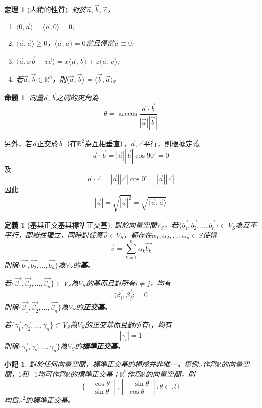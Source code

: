 \documentclass[12pt]{article}
\newcommand{\innerprod}[2]{\langle{#1},{#2}\rangle}
\newtheorem{definition}{定義}
\newtheorem*{theorem}{定理}
\newtheorem*{proposition}{命題}
\newtheorem*{remark}{小記}
\begin{document}
    \begin{theorem}[内積的性質]
        對於$\vec{a},\vec{b},\vec{c}$，\begin{enumerate}
            \item $\innerprod{0}{\vec{a}}=\innerprod{\vec{a}}{0}=0$;
            \item $\innerprod{\vec{a}}{\vec{a}}\geq 0$，$\innerprod{\vec{a}}{\vec{a}}=0$當且僅當$\vec{a}\equiv 0$;
            \item $\innerprod{\vec{a}}{x\vec{b}+z\vec{c}}=x\innerprod{\vec{a}}{\vec{b}}+z\innerprod{\vec{a}}{\vec{c}}$;
            \item 若$\vec{a},\vec{b}\in\mathbb{R}^n$，則$\innerprod{\vec{a}}{\vec{b}}=\innerprod{\vec{b}}{\vec{a}}$。
        \end{enumerate}
    \end{theorem}

    \begin{proposition}
        向量$\vec{a},\vec{b}$之間的夾角為$$\theta=\arccos{\frac{\vec{a}\cdot\vec{b}}{|\vec{a}||\vec{b}|}}$$
    \end{proposition}

    另外，若$\vec{a}$正交於$\vec{b}$（在$\mathbb{R}^2$為互相垂直），$\vec{a},\vec{c}$平行，則根據定義$$\vec{a}\cdot\vec{b}=|\vec{a}||\vec{b}|\cos{90^\circ}=0$$及$$\vec{a}\cdot\vec{c}=|\vec{a}||\vec{c}|\cos{0^\circ}=|\vec{a}||\vec{c}|$$
    因此$$|\vec{a}|=\sqrt{|\vec{a}|^2}=\sqrt{\innerprod{\vec{a}}{\vec{a}}}$$
    \begin{definition}[基與正交基與標準正交基]
        對於向量空間$V_S$，若$\{\vec{b_1},\vec{b_2},\dots,\vec{b_n}\}\subset V_S$為互不平行，即綫性獨立，同時對任意$\vec{v}\in V_S$，都存在$\alpha_1,\alpha_2,\dots,\alpha_n\in S$使得$$\vec{v}=\sum_{k=1}^{n}\alpha_k \vec{b_k}$$則稱$\{\vec{b_1},\vec{b_2},\dots,\vec{b_n}\}$為$V_S$的\textbf{基}。

        若$\{\vec{\beta_1},\vec{\beta_2},\dots,\vec{\beta_n}\}\subset V_S$為$V_S$的基而且對所有$i\neq j$，均有$$\innerprod{\vec{\beta_i}}{\vec{\beta_j}}=0$$則稱$\{\vec{\beta_1},\vec{\beta_2},\dots,\vec{\beta_n}\}$為$V_S$的\textbf{正交基}。

        若$\{\vec{\gamma_1},\vec{\gamma_2},\dots,\vec{\gamma_n}\}\subset V_S$為$V_S$的正交基而且對所有$i$，均有$$|\vec{\gamma_i}|=1$$則稱$\{\vec{\gamma_1},\vec{\gamma_2},\dots,\vec{\gamma_n}\}$為$V_S$的\textbf{標準正交基}。
    \end{definition}
    
    \begin{remark}
        對於任何向量空間，標準正交基的構成并非唯一。舉例$\mathbb{R}$作爲$\mathbb{R}$的向量空間，$1$和$-1$均可作爲$\mathbb{R}$的標準正交基；$\mathbb{R}^2$作爲$\mathbb{R}$的向量空間，則$$\{\begin{bmatrix}
            \cos{\theta}\\\sin{\theta}
        \end{bmatrix},\begin{bmatrix}
            -\sin{\theta}\\\cos{\theta}
        \end{bmatrix}:\theta\in\mathbb{R}\}$$均爲$\mathbb{R}^2$的標準正交基。
    \end{remark}
\end{document}

